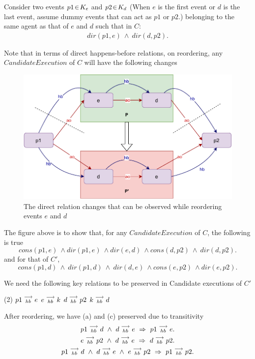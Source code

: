     Consider two events $p1\!\in\!K_e$ and $p2\!\in\!K_d$ (When $e$ is the first event or $d$ is the last event, assume dummy events that can act as $p1$ or $p2$.) belonging to the same agent as that of $e$ and $d$ such that in $C$:
    \begin{align*}
        dir(p1,e)\ \wedge\ dir(d,p2).
    \end{align*}
    
    Note that in terms of direct happens-before relations, on reordering, any $Candidate Execution$ of $C$ will have the following changes
    \begin{figure}[H]
        \centering
        \includegraphics[scale=0.7]{InstructionReordering/ValidReorderingProof/ProofParts/Part1/part1(b).pdf}
        \caption{The direct relation changes that can be observed while reordering events $e$ and $d$}
        \label{fig:my_label}
    \end{figure}
    
    The figure above is to show that, for any $Candidate Execution$ of $C$, the following is true
    \[
        cons(p1,e) \ \wedge dir(p1,e) \ \wedge dir(e,d) \ \wedge cons(d,p2) \ \wedge \ dir(d,p2).
    \]
    and for that of $C'$,
    \[
        cons(p1,d) \ \wedge \ dir(p1,d) \ \wedge \ dir(d,e) \ \wedge cons(e,p2) \ \wedge dir(e,p2).
    \]
    
    We need the following key relations to be preserved in Candidate executions of $C'$ 
    \begin{tasks}(2)
        \task $p1\stackrel{\longrightarrow}{_{hb}}e$
        \task $e\stackrel{\longrightarrow}{_{hb}}k$
        \task $d\stackrel{\longrightarrow}{_{hb}}p2$
        \task $k\stackrel{\longrightarrow}{_{hb}}d$ 
    \end{tasks}

    After reordering, we have (a) and (c) preserved due to transitivity  
    \begin{gather*}
        \reln{p1}{hb}{d} \ \wedge \ \reln{d}{hb}{e} \ \Rightarrow \ \reln{p1}{hb}{e}. \\
        \reln{e}{hb}{p2} \ \wedge \ \reln{d}{hb}{e} \ \Rightarrow \ \reln{d}{hb}{p2}. \\
        \reln{p1}{hb}{d} \ \wedge \ \reln{d}{hb}{e} \ \wedge \ \reln{e}{hb}{p2} \ \Rightarrow \ \reln{p1}{hb}{p2}. 
    \end{gather*}


